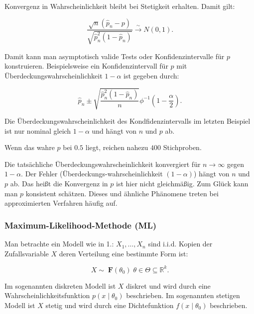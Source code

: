 \documentclass[10pt]{article}
\newcommand{\FZV}{X_1, \ldots, X_n} %
\newcommand{\IR}{\mathbb{R}} %
\newcommand{\KV}{\overset{\sim} \longrightarrow} %
\newenvironment{BSP}[1][]
{\begin{Beispiel}[frametitle=#1]}{\end{Beispiel}}
\begin{document}
\begin{BSP}[Beispiel 1..... (Delta-Methode)]
		\noindent Konvergenz in Wahrscheinlichkeit bleibt bei Stetigkeit erhalten. Damit gilt:
		
		\begin{equation*}
			\frac{\sqrt{n}(\hat{p}_n-p)}{\sqrt{\hat{p}_n^2(1-\hat{p}_n)}} \KV N(0,1).
		\end{equation*}
		
		Damit kann man asymptotisch valide Tests oder Konfidenzintervalle für $p$ konstruieren. Beispielsweise ein Konfidenzintervall für $p$ mit Überdeckungswahrscheinlichkeit $1-\alpha$ ist gegeben durch:
		
		\begin{equation*}
			\hat{p}_n \pm \sqrt{\frac{\hat{p}_n^2 (1-\hat{p}_n)}{n}} \phi^{-1} \left(1-\frac{\alpha}{2}\right).
		\end{equation*}
		
	\end{BSP}
	
	\noindent Die Überdeckungswahrscheinlichkeit des Kondfidenzintervalls im letzten Beispiel ist nur nominal gleich $1-\alpha$ und hängt von $n$ und $p$ ab. 
	
	\noindent Wenn das wahre $p$ bei $0.5$ liegt, reichen nahezu $400$ Stichproben. 
	
	Die tatsächliche Überdeckungswahrscheinlichkeit konvergiert für  $n \rightarrow \infty$ gegen $1-\alpha$. Der Fehler (Überdeckungs-wahrscheinlichkeit $(1-\alpha)$) hängt von $n$ und $p$ ab. Das heißt die Konvergenz in $p$ ist hier nicht gleichmäßig. Zum Glück kann man $p$ konsistent schätzen. Dieses und ähnliche Phänomene treten bei approximierten Verfahren häufig auf. 
	
	
	\subsubsection{Maximum-Likelihood-Methode (ML)}
	
	Man betrachte ein Modell wie in 1.: $\FZV$ sind i.i.d. Kopien der Zufallsvariable $X$ deren Verteilung eine bestimmte Form ist: 
	
	\begin{equation*}
		X \sim \; \textbf{F}(\theta_0) \;	\theta \in \Theta \subseteq \IR^k.
	\end{equation*}
	 
	\noindent Im sogenannten diskreten Modell ist $X$ diskret und wird durch eine Wahrscheinlichkeitsfunktion $p(x \mid \theta_0)$ beschrieben. 
	Im sogenannten stetigen Modell ist $X$ stetig und wird durch eine Dichtefunktion $f(x \mid \theta_0)$ beschrieben. 
	
\end{document}

